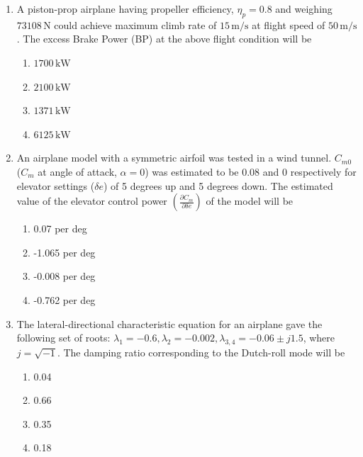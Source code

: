 \documentclass{article}
\begin{document}
\begin{enumerate}
    \item A piston-prop airplane having propeller efficiency, $\eta_p = 0.8$ and weighing $73108 \, \mathrm{N}$ could achieve maximum climb rate of $15 \, \mathrm{m/s}$ at flight speed of $50 \, \mathrm{m/s}$. The excess Brake Power (BP) at the above flight condition will be 
    \begin{multicols}{4}
    \begin{enumerate}
        \item $1700 \, \mathrm{kW}$ 
        \item $2100 \, \mathrm{kW}$ 
        \item $1371 \, \mathrm{kW}$ 
        \item $6125 \, \mathrm{kW}$
    \end{enumerate}
    \end{multicols}
        

    \item An airplane model with a symmetric airfoil was tested in a wind tunnel. $C_{m0}$ ($C_m$ at angle of attack, $\alpha = 0$) was estimated to be 0.08 and 0 respectively for elevator settings ($\delta e$) of 5 degrees up and 5 degrees down. The estimated value of the elevator control power $\left( \frac{\partial C_m}{\partial \delta e} \right)$ of the model will be 
    \begin{multicols}{4}
    \begin{enumerate}
        \item 0.07 per deg 
        \item -1.065 per deg 
        \item -0.008 per deg 
        \item -0.762 per deg
    \end{enumerate}
    \end{multicols}
        

    \item The lateral-directional characteristic equation for an airplane gave the following set of roots: $\lambda_1 = -0.6, \lambda_2 = -0.002, \lambda_{3,4} = -0.06 \pm j1.5$, where $\textit{j} = \sqrt{-1}$. The damping ratio corresponding to the Dutch-roll mode will be
    \begin{multicols}{4}
    \begin{enumerate}
        \item 0.04
        \item 0.66
        \item 0.35
        \item 0.18
    \end{enumerate}
    \end{multicols}


\end{enumerate}
\end{document}
